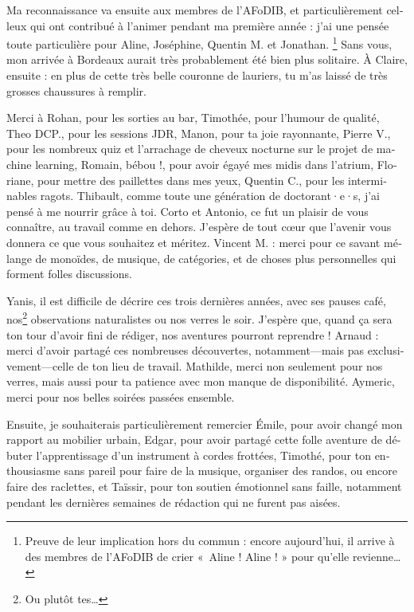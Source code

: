 \begin{french}
Ma reconnaissance va ensuite aux membres de l'AFoDIB,
et particulièrement celleux qui ont contribué à
l'animer pendant ma première année : j'ai une pensée toute particulière pour Aline,
Joséphine, Quentin M. et Jonathan.%
\footnote{Preuve de leur implication hors du commun : encore aujourd'hui,
il arrive à des membres de l'AFoDIB de crier « Aline ! Aline ! » pour qu'elle revienne…}
Sans vous, mon arrivée à Bordeaux aurait très probablement été bien plus solitaire.
À Claire, ensuite : en plus de cette très belle couronne de lauriers, tu m'as laissé de très grosses chaussures à remplir.

Merci à Rohan, pour les sorties au bar,
Timothée, pour l'humour de qualité,
Theo DCP., pour les sessions JDR,
Manon, pour ta joie rayonnante,
Pierre V., pour les nombreux quiz et l'arrachage de cheveux nocturne sur le projet de machine learning,
Romain, bébou !, pour avoir égayé mes midis dans l'atrium,
Floriane, pour mettre des paillettes dans mes yeux,
Quentin C., pour les interminables ragots.
Thibault, comme toute une génération de doctorant·e·s,
j'ai pensé à me nourrir grâce à toi. Corto et Antonio, ce fut un plaisir
de vous connaître, au travail comme en dehors. J'espère de tout cœur que l'avenir vous
donnera ce que vous souhaitez et méritez. Vincent M. : merci pour ce
savant mélange de monoïdes, de musique, de catégories, et de choses plus personnelles
qui forment folles discussions.

Yanis, il est difficile de décrire ces trois dernières années, avec ses pauses café,
nos\footnote{Ou plutôt tes…} observations naturalistes ou nos verres le soir. J'espère que, quand ça sera ton tour d'avoir
fini de rédiger, nos aventures pourront reprendre !
Arnaud : merci d'avoir partagé ces nombreuses découvertes, notamment---mais pas
exclusivement---celle de ton lieu de travail.
Mathilde, merci non seulement pour nos verres, mais aussi pour ta patience avec mon manque
de disponibilité.
Aymeric, merci pour nos belles soirées passées ensemble.

Ensuite, je souhaiterais particulièrement remercier Émile, pour avoir changé mon rapport
au mobilier urbain, Edgar, pour avoir partagé cette folle aventure de débuter
l'apprentissage d'un instrument à cordes frottées,
Timothé, pour ton enthousiasme sans pareil pour faire de la musique, organiser des randos,
ou encore faire des raclettes, et Taïssir, pour ton soutien émotionnel sans faille,
notamment pendant les dernières semaines de rédaction qui ne furent pas aisées.


\end{french}

